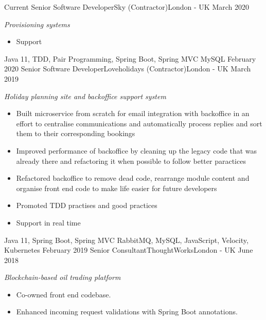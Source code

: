 %
%
%

  \begin{experiences}
    \experience
      {Current}
      {Senior Software Developer}{Sky (Contractor)}{London - UK}
      {March 2020}
      {
        \emph{Provisioning systems}
        \begin{itemize}
          \item Support
        \end{itemize}
      }
      {Java 11, TDD, Pair Programming, Spring Boot, Spring MVC}
      {MySQL}
    \emptySeparator
    \experience
      {February 2020}
      {Senior Software Developer}{Loveholidays (Contractor)}{London - UK}
      {March 2019}
      {
        \emph{Holiday planning site and backoffice support system}
        \begin{itemize}
          \item Built microservice from scratch for email integration with backoffice in an effort to centralise communications and automatically process replies and sort them to their corresponding bookings
          \item Improved performance of backoffice by cleaning up the legacy code that was already there and refactoring it when possible to follow better paractices
          \item Refactored backoffice to remove dead code, rearrange module content and organise front end code to make life easier for future developers
          \item Promoted TDD practises and good practices
          \item Support in real time
        \end{itemize}
      }
      {Java 11, Spring Boot, Spring MVC}
      {RabbitMQ, MySQL, JavaScript, Velocity, Kubernetes}
    \emptySeparator
    \experience
      {February 2019}
      {Senior Consultant}{ThoughtWorks}{London - UK}
      {June 2018}
      {
        \emph{Blockchain-based oil trading platform}
        \begin{itemize}
          \item Co-owned front end codebase.
          \item Enhanced incoming request validations with Spring Boot annotations.

\end{itemize}}
\end{experiences}
